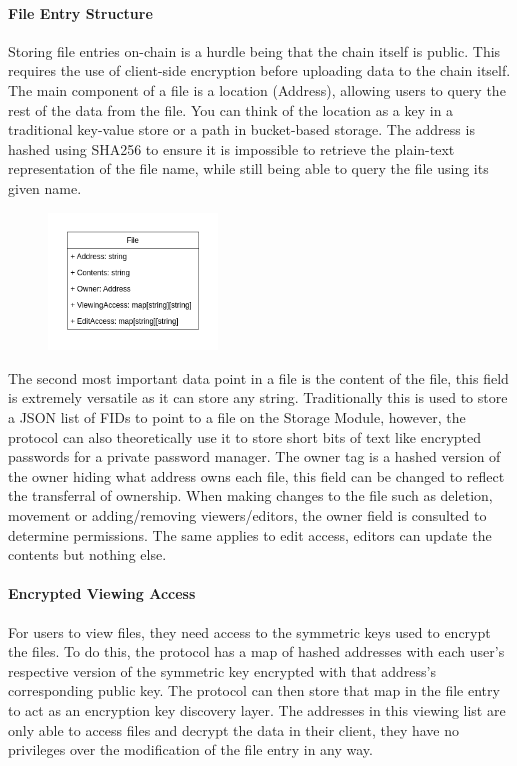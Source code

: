 \documentclass[a4paper]{article}
\begin{document}
\paragraph{File Entry Structure}
Storing file entries on-chain is a hurdle being that the chain itself is public. This requires the use of client-side encryption before uploading data to the chain itself. The main component of a file is a location (Address), allowing users to query the rest of the data from the file. You can think of the location as a key in a traditional key-value store or a path in bucket-based storage. The address is hashed using SHA256 to ensure it is impossible to retrieve the plain-text representation of the file name, while still being able to query the file using its given name. 

\begin{figure}[!htbp]
\centering
\includegraphics[width=0.4\textwidth]{assets/filetree2.png}
\end{figure}

\newpage
The second most important data point in a file is the content of the file, this field is extremely versatile as it can store any string. Traditionally this is used to store a JSON list of FIDs to point to a file on the Storage Module, however, the protocol can also theoretically use it to store short bits of text like encrypted passwords for a private password manager. The owner tag is a hashed version of the owner hiding what address owns each file, this field can be changed to reflect the transferral of ownership. When making changes to the file such as deletion, movement or adding/removing viewers/editors, the owner field is consulted to determine permissions. The same applies to edit access, editors can update the contents but nothing else. 

\paragraph{Encrypted Viewing Access}
For users to view files, they need access to the symmetric keys used to encrypt the files. To do this, the protocol has a map of hashed addresses with each user's respective version of the symmetric key encrypted with that address's corresponding public key. The protocol can then store that map in the file entry to act as an encryption key discovery layer. The addresses in this viewing list are only able to access files and decrypt the data in their client, they have no privileges over the modification of the file entry in any way.
\end{document}
